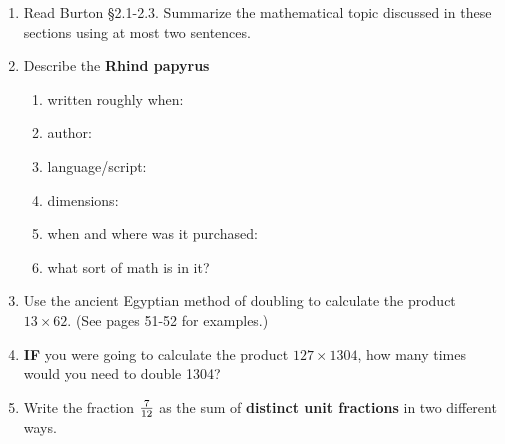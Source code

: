 \documentclass[12pt]{article}
\renewcommand{\emph}[1]{\textsf{\textbf{#1}}}
\begin{document}
\begin{enumerate}
\item Read Burton \S 2.1-2.3. Summarize the mathematical topic discussed in these sections using at most two sentences.
\vspace{1in}
\item Describe the \emph{Rhind papyrus}
	\begin{enumerate}
	\item written roughly when:
	
	\item author:
	
	\item language/script: 
	
	\item dimensions: 
	
	\item when and where was it purchased:
	
	\item what sort of math is in it?
	
	\vfill
	\end{enumerate}
\item Use the ancient Egyptian method of doubling to calculate the product $13 \times 62.$ (See pages 51-52 for examples.)
\vspace{1.5in}
\item \textbf{IF} you were going to calculate the product $127 \times 1304$, how many times would you need to double 1304?
\vfill
\item Write the fraction $\large{\frac{7}{12}}$ as the sum of \emph{distinct unit fractions} in two different ways.
\vfill
\end{enumerate}
\end{document}
